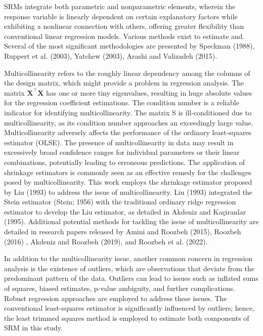 \documentclass[twoside]{article}
\begin{document}
SRMs integrate both parametric and nonparametric elements, wherein the response variable is linearly dependent on certain explanatory factors while exhibiting a nonlinear connection with others, offering greater flexibility than conventional linear regression models. Various methods exist to estimate and. Several of the most significant methodologies are presented by Speckman (1988), Ruppert et al. (2003), Yatchew (2003), Arashi and Valizadeh (2015).




Multicollinearity refers to the roughly linear dependency among the columns of the design matrix, which might provide a problem in regression analysis. The matrix $\boldsymbol{X}^\top\boldsymbol{X}$  has one or more tiny eigenvalues, resulting in huge absolute values for the regression coefficient estimations. The condition number is a reliable indicator for identifying multicollinearity. The matrix S is ill-conditioned due to multicollinearity, as its condition number approaches an exceedingly large value. Multicollinearity adversely affects the performance of the ordinary least-squares estimator (OLSE). The presence of multicollinearity in data may result in excessively broad confidence ranges for individual parameters or their linear combinations, potentially leading to erroneous predictions. The application of shrinkage estimators is commonly seen as an effective remedy for the challenges posed by multicollinearity. This work employs the shrinkage estimator proposed by Liu (1993) to address the issue of multicollinearity. Liu (1993) integrated the Stein estimator (Stein; 1956) with the traditional ordinary ridge regression estimator to develop the Liu estimator, as detailed in Akdeniz and Kaçiranlar (1995). Additional potential methods for tackling the issue of multicollinearity are detailed in research papers released by Amini and Roozbeh (2015), Roozbeh (2016) , Akdeniz and Roozbeh (2019), and Roozbeh et al. (2022).


In addition to the multicollinearity issue, another common concern in regression analysis is the existence of outliers, which are observations that deviate from the predominant pattern of the data. Outliers can lead to issues such as inflated sums of squares, biased estimates, p-value ambiguity, and further complications. Robust regression approaches are employed to address these issues. The conventional least-squares estimator is significantly influenced by outliers; hence, the least trimmed squares method is employed to estimate both components of SRM in this study.
\end{document}
